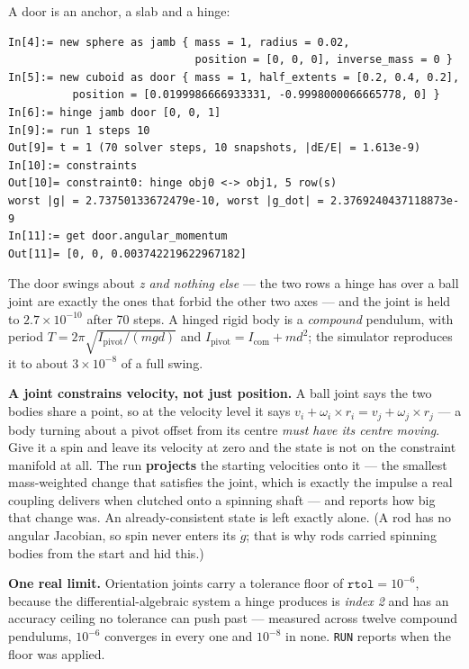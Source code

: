 \documentclass[11pt]{article}
\newcommand{\kw}[1]{\texttt{\uppercase{#1}}}
\begin{document}
A door is an anchor, a slab and a hinge:

\begin{lstlisting}
In[4]:= new sphere as jamb { mass = 1, radius = 0.02,
                             position = [0, 0, 0], inverse_mass = 0 }
In[5]:= new cuboid as door { mass = 1, half_extents = [0.2, 0.4, 0.2],
          position = [0.0199986666933331, -0.9998000066665778, 0] }
In[6]:= hinge jamb door [0, 0, 1]
In[9]:= run 1 steps 10
Out[9]= t = 1 (70 solver steps, 10 snapshots, |dE/E| = 1.613e-9)
In[10]:= constraints
Out[10]= constraint0: hinge obj0 <-> obj1, 5 row(s)
worst |g| = 2.73750133672479e-10, worst |g_dot| = 2.3769240437118873e-9
In[11]:= get door.angular_momentum
Out[11]= [0, 0, 0.003742219622967182]
\end{lstlisting}

The door swings about \emph{z and nothing else} --- the two rows a hinge
has over a ball joint are exactly the ones that forbid the other two
axes --- and the joint is held to $2.7\times10^{-10}$ after 70 steps. A
hinged rigid body is a \emph{compound} pendulum, with period
$T = 2\pi\sqrt{I_{\text{pivot}}/(mgd)}$ and
$I_{\text{pivot}} = I_{\text{com}} + md^2$; the simulator reproduces it
to about $3\times10^{-8}$ of a full swing.

\textbf{A joint constrains velocity, not just position.} A ball joint
says the two bodies share a point, so at the velocity level it says
$v_i + \omega_i\times r_i = v_j + \omega_j\times r_j$ --- a body turning
about a pivot offset from its centre \emph{must have its centre moving}.
Give it a spin and leave its velocity at zero and the state is not on the
constraint manifold at all. The run \textbf{projects} the starting
velocities onto it --- the smallest mass-weighted change that satisfies
the joint, which is exactly the impulse a real coupling delivers when
clutched onto a spinning shaft --- and reports how big that change was.
An already-consistent state is left exactly alone. (A rod has no angular
Jacobian, so spin never enters its $\dot g$; that is why rods carried
spinning bodies from the start and hid this.)

\textbf{One real limit.} Orientation joints carry a tolerance floor of
$\texttt{rtol}=10^{-6}$, because the differential-algebraic system a
hinge produces is \emph{index 2} and has an accuracy ceiling no tolerance
can push past --- measured across twelve compound pendulums, $10^{-6}$
converges in every one and $10^{-8}$ in none. \kw{run} reports when the
floor was applied.
\end{document}
